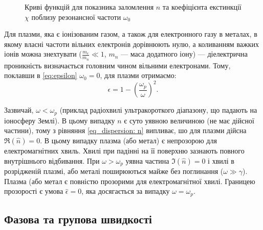 \begin{figure}[h!]\centering
	
	\caption{Криві функцій для показника заломлення $n$ та коефіцієнта екстинкції $\chi$ поблизу резонансної частоти $\omega_0$}
	\label{plt:n,a(omega)}
\end{figure}

Для плазми, яка є іонізованим газом, а також для електронного газу в металах, в якому власні частоти вільних електронів дорівнюють нулю, а коливанням важких іонів можна знехтувати ($\frac{m_e}{m_n} \ll 1$, $m_n$ --- маса додатного іону) ---
діелектрична проникність визначається головним чином
вільними електронами. Тому, поклавши в \eqref{eq:epsilon} $\omega_0 = 0$, для плазми отримаємо:
\begin{equation}\label{eq:plasm}
	\epsilon = 1 - \left( \frac{\omega_p}{\omega}\right)^2.
\end{equation}

Зазвичай, $\omega < \omega_p$ (приклад радіохвилі ультракороткого діапазону, що падають на іоносферу Землі). В цьому випадку $n$ є суто уявною
величиною (не має дійсної частини), тому з рівняння \eqref{eq_dispersion: n} випливає, шо для плазми дійсна $\Re{(\hat{n})} = 0$. В цьому випадку
плазма (або метал) є непрозорою для електромагнітних хвиль. Хвилі при падінні на її поверхню зазнають повного внутрішнього відбивання. При $\omega >
\omega_p$ уявна частина $\Im{(\hat{n})} = 0$ і хвилі в розрідженій плазмі, або металі поширюються майже без поглинання ($\omega \gg \gamma$). Плазма
(або метал є повністю прозорими для електромагнітної хвилі. Границею прозорості є умова $\hat{\epsilon} = 0$, яка досягається за випадку $\omega =
\omega_p$.





\subsection{Фазова та групова швидкості}



